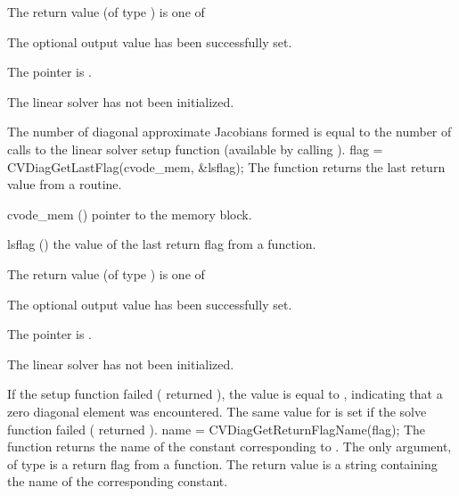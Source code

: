 {
  The return value  (of type ) is one of
  \begin{args}
  \item[\Id{CVDIAG\_SUCCESS}] 
    The optional output value has been successfully set.
  \item[\Id{CVDIAG\_MEM\_NULL}]
    The  pointer is .
  \item[\Id{CVDIAG\_LMEM\_NULL}]
    The {\cvdiag} linear solver has not been initialized.
  \end{args}
}
{
  The number of diagonal approximate Jacobians formed is
  equal to the number of calls to the linear solver setup function
  (available by calling ).
}
{
  flag = CVDiagGetLastFlag(cvode\_mem, \&lsflag);
}
{
  The function  returns the
  last return value from a {\cvdiag} routine. 
}
{
  \begin{args}
  \item[cvode\_mem] ()
    pointer to the {\cvode} memory block.
  \item[lsflag] ()
    the value of the last return flag from a {\cvdiag} function.
  \end{args}
}
{
  The return value  (of type ) is one of
  \begin{args}
  \item[\Id{CVDIAG\_SUCCESS}] 
    The optional output value has been successfully set.
  \item[\Id{CVDIAG\_MEM\_NULL}]
    The  pointer is .
  \item[\Id{CVDIAG\_LMEM\_NULL}]
    The {\cvdiag} linear solver has not been initialized.
  \end{args}
}
{
  If the {\cvdiag} setup function failed ( returned ),
  the value  is equal to , indicating that a zero
  diagonal element was encountered.
  The same value for  is set if the {\cvdiag} solve function failed
  ( returned ).
}
{
  name = CVDiagGetReturnFlagName(flag);
}
{
  The function  returns the
  name of the {\cvdiag} constant corresponding to .
}
{
  The only argument, of type  is a return flag from a {\cvdiag} function.
}
{
  The return value is a string containing the name of the corresponding constant.
}
{}

